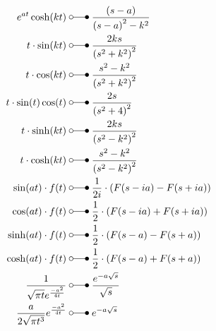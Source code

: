 \begin{align*}
    e^{at}\cosh(kt)                 \;                      & \laplace\; \frac{{(s-a)}}{{(s-a)}^2-k^2}                                      \\
    t\cdot \sin(kt)                 \;                      & \laplace\; \frac{2ks}{{(s^2+k^2)}^2}                                          \\
    t\cdot \cos(kt)                 \;                      & \laplace\; \frac{s^2-k^2}{{(s^2+k^2)}^2}                                      \\
    t\cdot \sin(t)\cos(t)           \;                      & \laplace\; \frac{2s}{{(s^2+4)}^2}                                             \\
    t\cdot \sinh(kt)                \;                      & \laplace\; \frac{2ks}{{(s^2-k^2)}^2}                                          \\
    t\cdot \cosh(kt)                \;                      & \laplace\; \frac{s^2-k^2}{{(s^2-k^2)}^2}                                      \\
    \sin(at)\cdot f(t)              \;                      & \laplace\; \frac{1}{2i}\cdot(F(s-ia)-F(s+ia))                                 \\
    \cos(at)\cdot f(t)              \;                      & \laplace\; \frac{1}{2}\cdot(F(s-ia)+F(s+ia))                                  \\
    \sinh(at)\cdot f(t)             \;                      & \laplace\; \frac{1}{2}\cdot(F(s-a)-F(s+a))                                    \\
    \cosh(at)\cdot f(t)             \;                      & \laplace\; \frac{1}{2}\cdot(F(s-a)+F(s+a))                                    \\
    \frac{1}{\sqrt{\pi t}e^{\frac{-a^2}{4t}}} \;            & \laplace\; \frac{e^{-a\sqrt{s}}}{\sqrt{s}}                                    \\
    \frac{a}{2\sqrt{\pi t^3}}e^{\frac{-a^2}{4t}} \;         & \laplace\; e^{-a\sqrt{s}}
\end{align*}